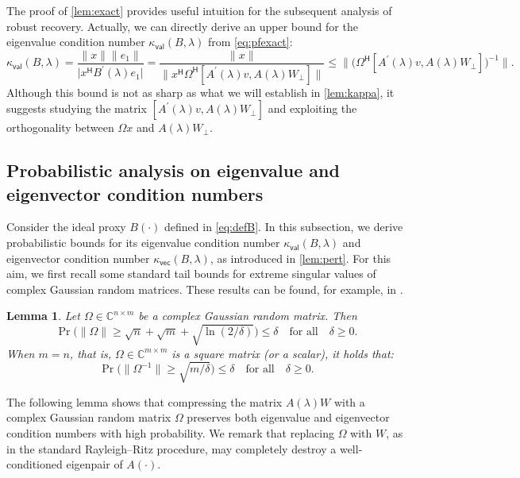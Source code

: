 \documentclass[a4paper,11pt]{article}
\newtheorem{lemma}{Lemma}
\newcommand{\Htran}{\mathsf{H}}
\newcommand{\C}{\mathbb{C}}
\newcommand{\kval}{\kappa_{\mathsf{val}}}
\newcommand{\kvec}{\kappa_{\mathsf{vec}}}
\providecommand{\abs}[1]{\lvert#1\rvert}
\providecommand{\norm}[1]{\lVert#1\rVert}
\providecommand{\bignorm}[1]{\bigl\lVert#1\bigr\rVert}
\begin{document}
The proof of \cref{lem:exact} provides useful intuition for the subsequent analysis of robust recovery.
Actually, we can directly derive an upper bound for the eigenvalue condition number $\kval(B,\lambda)$ from \cref{eq:pfexact}:
\begin{equation*}
    \kval(B,\lambda)
    = \frac{\norm{x}\norm{e_{1}}}{\abs{x^{\Htran}B^{\prime}(\lambda)e_{1}}}
    = \frac{\norm{x}}{\norm{x^{\Htran}\Omega^{\Htran}[A^{\prime}(\lambda)v,A(\lambda)W_{\perp}]}}
    \leq \bignorm{\bigl(\Omega^{\Htran}[A^{\prime}(\lambda)v,A(\lambda)W_{\perp}]\bigr)^{-1}}.
\end{equation*}
Although this bound is not as sharp as what we will establish in \cref{lem:kappa}, it suggests studying the matrix $[A^{\prime}(\lambda)v,A(\lambda)W_{\perp}]$ and exploiting the orthogonality between $\Omega x$ and $A(\lambda)W_{\perp}$.


\subsection{Probabilistic analysis on eigenvalue and eigenvector condition numbers}
Consider the ideal proxy $B(\cdot)$ defined in \cref{eq:defB}.
In this subsection, we derive probabilistic bounds for its eigenvalue condition number $\kval(B,\lambda)$ and eigenvector condition number $\kvec(B,\lambda)$, as introduced in \cref{lem:pert}. For this aim, we first recall some standard tail bounds for extreme singular values of complex Gaussian random matrices. These results can be found, for example, in \cite{Rudelson2010,Edelman1988}.
\begin{lemma}
    \label{lem:Gaussian}
    Let $\Omega\in\C^{n\times m}$ be a complex Gaussian random matrix. Then 
    \begin{equation*}
        \Pr\bigl(\norm{\Omega}\geq \sqrt{n}+\sqrt{m}+\sqrt{\ln(2/\delta)}\bigr)\leq \delta
        \quad\text{for all}\quad \delta\geq 0. 
    \end{equation*}
    When $m=n$, that is, $\Omega\in\C^{m\times m}$ is a square matrix (or a scalar), it holds that:
    \begin{equation*}
        \Pr\bigl(\norm{\Omega^{-1}}\geq \sqrt{m/\delta}\bigr)\leq \delta \quad\text{for all}\quad \delta \geq 0. 
    \end{equation*}
\end{lemma}

The following lemma shows that compressing the matrix $A(\lambda)W$ with a complex Gaussian random matrix $\Omega$ preserves both eigenvalue and eigenvector condition numbers with high probability.
We remark that replacing $\Omega$ with $W$, as in the standard Rayleigh--Ritz procedure, may completely destroy a well-conditioned eigenpair of $A(\cdot)$.
\end{document}
